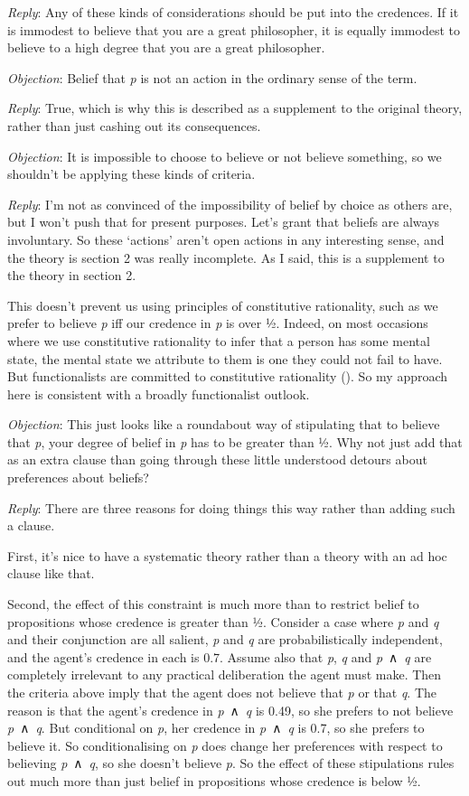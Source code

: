 \documentclass[
  10pt,
  letterpaper,
  DIV=11,
  numbers=noendperiod,
  twoside]{scrartcl}
\begin{document}
\emph{Reply}: Any of these kinds of considerations should be put into
the credences. If it is immodest to believe that you are a great
philosopher, it is equally immodest to believe to a high degree that you
are a great philosopher.

\emph{Objection}: Belief that \emph{p} is not an action in the ordinary
sense of the term.

\emph{Reply}: True, which is why this is described as a supplement to
the original theory, rather than just cashing out its consequences.

\emph{Objection}: It is impossible to choose to believe or not believe
something, so we shouldn't be applying these kinds of criteria.

\emph{Reply}: I'm not as convinced of the impossibility of belief by
choice as others are, but I won't push that for present purposes. Let's
grant that beliefs are always involuntary. So these `actions' aren't
open actions in any interesting sense, and the theory is section 2 was
really incomplete. As I said, this is a supplement to the theory in
section 2.

This doesn't prevent us using principles of constitutive rationality,
such as we prefer to believe \emph{p} iff our credence in \emph{p} is
over ½. Indeed, on most occasions where we use constitutive rationality
to infer that a person has some mental state, the mental state we
attribute to them is one they could not fail to have. But functionalists
are committed to constitutive rationality
(). So my approach here is
consistent with a broadly functionalist outlook.

\emph{Objection}: This just looks like a roundabout way of stipulating
that to believe that \emph{p}, your degree of belief in \emph{p} has to
be greater than ½. Why not just add that as an extra clause than going
through these little understood detours about preferences about beliefs?

\emph{Reply}: There are three reasons for doing things this way rather
than adding such a clause.

First, it's nice to have a systematic theory rather than a theory with
an ad hoc clause like that.

Second, the effect of this constraint is much more than to restrict
belief to propositions whose credence is greater than ½. Consider a case
where \emph{p} and \emph{q} and their conjunction are all salient,
\emph{p} and \emph{q} are probabilistically independent, and the agent's
credence in each is 0.7. Assume also that \emph{p}, \emph{q} and
\emph{p}~∧~\emph{q} are completely irrelevant to any practical
deliberation the agent must make. Then the criteria above imply that the
agent does not believe that \emph{p} or that \emph{q}. The reason is
that the agent's credence in \emph{p}~∧~\emph{q} is 0.49, so she prefers
to not believe \emph{p}~∧~\emph{q}. But conditional on \emph{p}, her
credence in \emph{p}~∧~\emph{q} is 0.7, so she prefers to believe it. So
conditionalising on \emph{p} does change her preferences with respect to
believing \emph{p}~∧~\emph{q}, so she doesn't believe \emph{p}. So the
effect of these stipulations rules out much more than just belief in
propositions whose credence is below ½.
\end{document}
